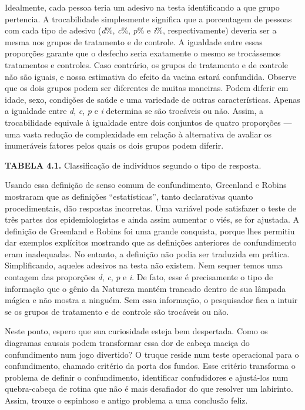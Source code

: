 \documentclass[11pt,a5paper,twoside]{book}
\begin{document}
Idealmente, cada pessoa teria um adesivo na testa identificando a que grupo pertencia. A trocabilidade simplesmente significa que a porcentagem de pessoas com cada tipo de adesivo (\textit{d}\%, \textit{c}\%, \textit{p}\% e \textit{i}\%, respectivamente) deveria ser a mesma nos grupos de tratamento e de controle. A igualdade entre essas proporções garante que o desfecho seria exatamente o mesmo se trocássemos tratamentos e controles. Caso contrário, os grupos de tratamento e de controle não são iguais, e nossa estimativa do efeito da vacina estará confundida. Observe que os dois grupos podem ser diferentes de muitas maneiras. Podem diferir em idade, sexo, condições de saúde e uma variedade de outras características. Apenas a igualdade entre \textit{d}, \textit{c}, \textit{p} e \textit{i} determina se são trocáveis ou não. Assim, a trocabilidade equivale à igualdade entre dois conjuntos de quatro proporções — uma vasta redução de complexidade em relação à alternativa de avaliar os inumeráveis fatores pelos quais os dois grupos podem diferir.

\textbf{TABELA 4.1.} Classificação de indivíduos segundo o tipo de resposta.

Usando essa definição de senso comum de confundimento, Greenland e Robins mostraram que as definições “estatísticas”, tanto declarativas quanto procedimentais, dão respostas incorretas. Uma variável pode satisfazer o teste de três partes dos epidemiologistas e ainda assim aumentar o viés, se for ajustada. A definição de Greenland e Robins foi uma grande conquista, porque lhes permitiu dar exemplos explícitos mostrando que as definições anteriores de confundimento eram inadequadas. No entanto, a definição não podia ser traduzida em prática. Simplificando, aqueles adesivos na testa não existem. Nem sequer temos uma contagem das proporções \textit{d}, \textit{c}, \textit{p} e \textit{i}. De fato, esse é precisamente o tipo de informação que o gênio da Natureza mantém trancado dentro de sua lâmpada mágica e não mostra a ninguém. Sem essa informação, o pesquisador fica a intuir se os grupos de tratamento e de controle são trocáveis ou não.

Neste ponto, espero que sua curiosidade esteja bem despertada. Como os diagramas causais podem transformar essa dor de cabeça maciça do confundimento num jogo divertido? O truque reside num teste operacional para o confundimento, chamado critério da porta dos fundos. Esse critério transforma o problema de definir o confundimento, identificar confudidores e ajustá-los num quebra-cabeça de rotina que não é mais desafiador do que resolver um labirinto. Assim, trouxe o espinhoso e antigo problema a uma conclusão feliz.
\end{document}
